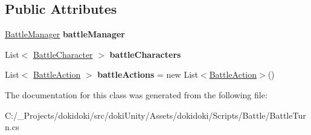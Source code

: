 \subsection*{Public Attributes}
\begin{DoxyCompactItemize}
\item 
\hyperlink{classdoki_battle_1_1_battle_manager}{Battle\+Manager} {\bfseries battle\+Manager}\hypertarget{classdoki_battle_1_1_battle_turn_aa63328382cb68118b21b9f6c6025eead}{}\label{classdoki_battle_1_1_battle_turn_aa63328382cb68118b21b9f6c6025eead}

\item 
List$<$ \hyperlink{classdoki_battle_1_1_battle_character}{Battle\+Character} $>$ {\bfseries battle\+Characters}\hypertarget{classdoki_battle_1_1_battle_turn_a884d9066fd8fadbbfc7dc83658b37adb}{}\label{classdoki_battle_1_1_battle_turn_a884d9066fd8fadbbfc7dc83658b37adb}

\item 
List$<$ \hyperlink{classdoki_battle_1_1_battle_action}{Battle\+Action} $>$ {\bfseries battle\+Actions} = new List$<$\hyperlink{classdoki_battle_1_1_battle_action}{Battle\+Action}$>$()\hypertarget{classdoki_battle_1_1_battle_turn_ad02800fe18c5a4ff7ef6a7e2a61641d8}{}\label{classdoki_battle_1_1_battle_turn_ad02800fe18c5a4ff7ef6a7e2a61641d8}

\end{DoxyCompactItemize}


The documentation for this class was generated from the following file\+:\begin{DoxyCompactItemize}
\item 
C\+:/\+\_\+\+Projects/dokidoki/src/doki\+Unity/\+Assets/dokidoki/\+Scripts/\+Battle/Battle\+Turn.\+cs\end{DoxyCompactItemize}
